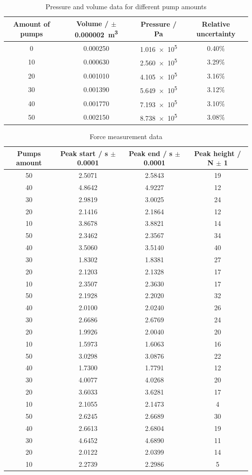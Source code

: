 \documentclass[12pt,a4paper]{article}
\begin{document}
\begin{table}[H]
\centering
\caption{Pressure and volume data for different pump amounts}
\begin{tabular}{@{}cccc@{}}
\toprule
\textbf{Amount of pumps} & \textbf{Volume / $\pm$\SI{0.000002}{\meter\cubed}} & \textbf{Pressure / \si{\pascal}} & \textbf{Relative uncertainty} \\
\midrule
0 & 0.000250 & \num{1.016e5} & 0.40\% \\
10 & 0.000630 & \num{2.560e5} & 3.29\% \\
20 & 0.001010 & \num{4.105e5} & 3.16\% \\
30 & 0.001390 & \num{5.649e5} & 3.12\% \\
40 & 0.001770 & \num{7.193e5} & 3.10\% \\
50 & 0.002150 & \num{8.738e5} & 3.08\% \\
\bottomrule
\end{tabular}
\end{table}

\begin{table}[H]
\centering
\caption{Force measurement data}
\begin{tabular}{@{}cccc@{}}
\toprule
\textbf{Pumps amount} & \textbf{Peak start / \si{\second} $\pm$ 0.0001} & \textbf{Peak end / \si{\second} $\pm$ 0.0001} & \textbf{Peak height / \si{\newton} $\pm$ 1} \\
\midrule
50 & 2.5071 & 2.5843 & 19 \\
40 & 4.8642 & 4.9227 & 12 \\
30 & 2.9819 & 3.0025 & 24 \\
20 & 2.1416 & 2.1864 & 12 \\
10 & 3.8678 & 3.8821 & 14 \\
50 & 2.3462 & 2.3567 & 34 \\
40 & 3.5060 & 3.5140 & 40 \\
30 & 1.8302 & 1.8381 & 27 \\
20 & 2.1203 & 2.1328 & 17 \\
10 & 2.3507 & 2.3630 & 17 \\
50 & 2.1928 & 2.2020 & 32 \\
40 & 2.0100 & 2.0240 & 26 \\
30 & 2.6686 & 2.6769 & 24 \\
20 & 1.9926 & 2.0040 & 20 \\
10 & 1.5973 & 1.6063 & 16 \\
50 & 3.0298 & 3.0876 & 22 \\
40 & 1.7300 & 1.7791 & 12 \\
30 & 4.0077 & 4.0268 & 20 \\
20 & 3.6033 & 3.6281 & 17 \\
10 & 2.1055 & 2.1473 & 4 \\
50 & 2.6245 & 2.6689 & 30 \\
40 & 2.6613 & 2.6804 & 19 \\
30 & 4.6452 & 4.6890 & 11 \\
20 & 2.0122 & 2.0399 & 14 \\
10 & 2.2739 & 2.2986 & 5 \\
\bottomrule
\end{tabular}
\end{table}
\end{document}
